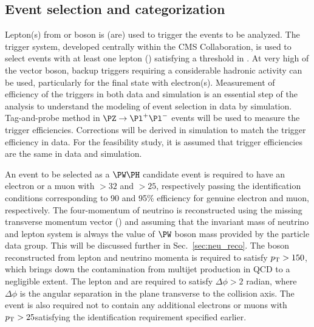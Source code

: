 \documentclass[a4paper,11pt]{article}
\newcommand{\Pb}{{{\Pqb}}\xspace}
\newcommand{\PAb}{{{{\Paqb}}}\xspace}
\begin{document}

\subsection{Event selection and categorization}

Lepton(s) from \PW or \PZ boson is (are) used to trigger the events to be analyzed. 
The trigger system, developed centrally within the CMS Collaboration, is used to select events with at least one lepton (\Pl) satisfying a threshold in {\pt}.
At very high \pt of the vector boson, backup triggers requiring a considerable hadronic activity can be used, particularly for the final state with electron(s). 
Measurement of efficiency of the triggers in both data and simulation is an essential step of the analysis to understand the modeling of event selection in data by simulation.
Tag-and-probe method in $\PZ \to {\Pl}^{+} {\Pl}^{-}$ events will be used to measure the trigger efficiencies. Corrections will be derived in simulation to match the trigger efficiency in data.
For the feasibility study, it is assumed that trigger efficiencies are the same in data and simulation.

An event to be selected as a $\PW\PH$ candidate event is required to have an electron or a muon with \pt$>32$ and $>25$\GeV, respectively passing the identification conditions corresponding to 90 and 95\% efficiency for genuine electron and muon, respectively. 
The four-momentum of neutrino is reconstructed using the missing transverse momentum vector (\ptvecmiss) and assuming that the invariant mass of neutrino and lepton system is always the value of $\PW$ boson mass provided by the particle data group. 
This will be discussed further in Sec.~\ref{sec:neu_reco}. 
The \PW boson reconstructed from lepton and neutrino momenta is required to satisfy $p_{\mathrm{T}} > 150$\GeV, which brings down the contamination from multijet production in QCD to a negligible extent.
The lepton and \ptvecmiss are required to satisfy $\Delta \phi > 2$ radian, where $\Delta \phi$ is the angular separation in the plane transverse to the collision axis.
The event is also required not to contain any additional electrons or muons with $p_{\mathrm{T}}>25$\GeV satisfying the identification requirement specified earlier.
\end{document}
